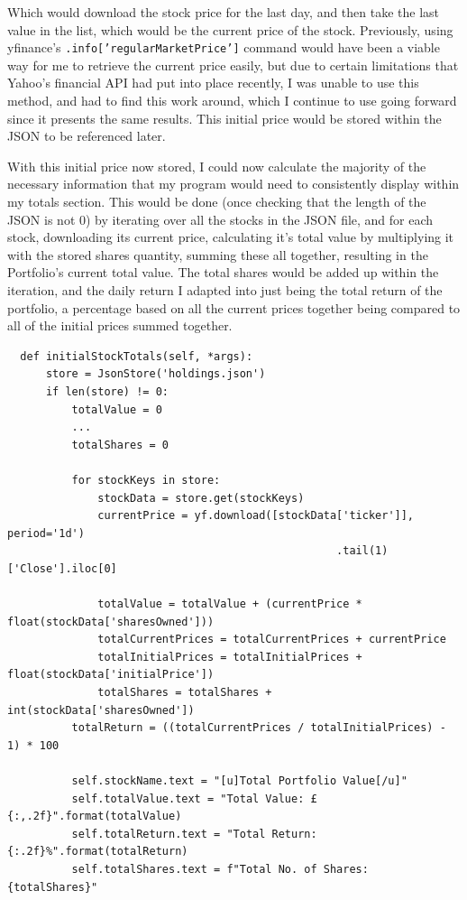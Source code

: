 \documentclass{article}
\begin{document}
\vspace{0.3cm}
Which would download the stock price for the last day, and then take the last value in the list, which would be the current price of the stock. Previously, using yfinance's \texttt{.info['regularMarketPrice']} command would have been a viable way for me to retrieve the current price easily, but due to certain limitations that Yahoo's financial API had put into place recently, I was unable to use this method, and had to find this work around, which I continue to use going forward since it presents the same results. This initial price would be stored within the JSON to be referenced later.\\\vspace{0.3cm}

With this initial price now stored, I could now calculate the majority of the necessary information that my program would need to consistently display within my totals section. This would be done (once checking that the length of the JSON is not 0) by iterating over all the stocks in the JSON file, and for each stock, downloading its current price, calculating it's total value by multiplying it with the stored shares quantity, summing these all together, resulting in the Portfolio's current total value. The total shares would be added up within the iteration, and the daily return I adapted into just being the total return of the portfolio, a percentage based on all the current prices together being compared to all of the initial prices summed together.\\\vspace{0.3cm}

\begin{verbatim}
  def initialStockTotals(self, *args):
      store = JsonStore('holdings.json')
      if len(store) != 0:
          totalValue = 0
          ...
          totalShares = 0

          for stockKeys in store:
              stockData = store.get(stockKeys)
              currentPrice = yf.download([stockData['ticker']], period='1d')
                                                   .tail(1)['Close'].iloc[0]

              totalValue = totalValue + (currentPrice * float(stockData['sharesOwned']))
              totalCurrentPrices = totalCurrentPrices + currentPrice
              totalInitialPrices = totalInitialPrices + float(stockData['initialPrice'])
              totalShares = totalShares + int(stockData['sharesOwned'])
          totalReturn = ((totalCurrentPrices / totalInitialPrices) - 1) * 100

          self.stockName.text = "[u]Total Portfolio Value[/u]"
          self.totalValue.text = "Total Value: £{:,.2f}".format(totalValue)
          self.totalReturn.text = "Total Return: {:.2f}%".format(totalReturn)
          self.totalShares.text = f"Total No. of Shares: {totalShares}"
\end{verbatim}
\end{document}
